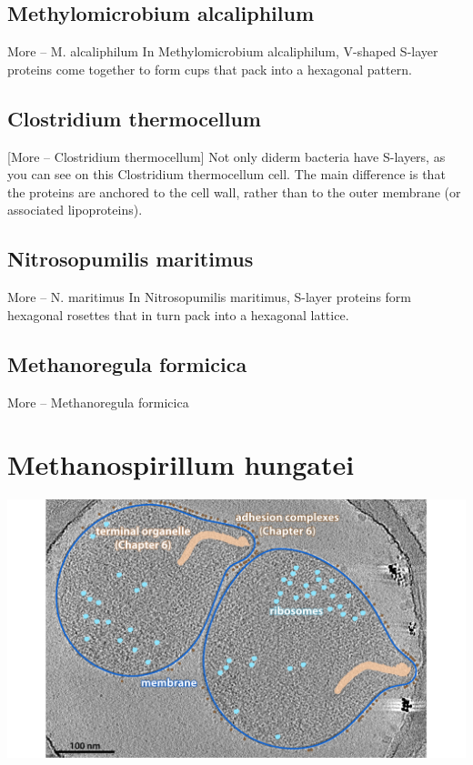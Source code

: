 \documentclass[]{tufte-book}
\begin{document}
\subsection{Methylomicrobium
alcaliphilum}\label{methylomicrobium-alcaliphilum}

More -- M. alcaliphilum In Methylomicrobium alcaliphilum, V-shaped
S-layer proteins come together to form cups that pack into a hexagonal
pattern.

\subsection{Clostridium thermocellum}\label{clostridium-thermocellum}

{[}More -- Clostridium thermocellum{]} Not only diderm bacteria have
S-layers, as you can see on this Clostridium thermocellum cell. The main
difference is that the proteins are anchored to the cell wall, rather
than to the outer membrane (or associated lipoproteins).

\subsection{Nitrosopumilis maritimus}\label{nitrosopumilis-maritimus}

More -- N. maritimus In Nitrosopumilis maritimus, S-layer proteins form
hexagonal rosettes that in turn pack into a hexagonal lattice.

\subsection{Methanoregula formicica}\label{methanoregula-formicica}

More -- Methanoregula formicica

\section{Methanospirillum hungatei}\label{methanospirillum-hungatei}

\includegraphics{img/02_static/2_1_Mgenitalium}
\end{document}
